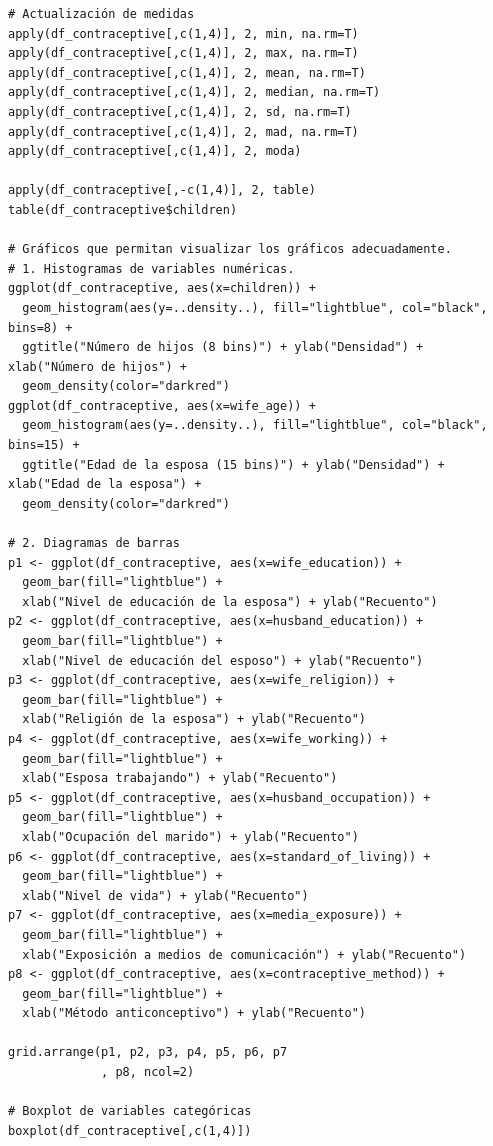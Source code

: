 \documentclass[a4paper,12pt, oneside]{book}
\begin{document}
\begin{verbatim}
# Actualización de medidas
apply(df_contraceptive[,c(1,4)], 2, min, na.rm=T)
apply(df_contraceptive[,c(1,4)], 2, max, na.rm=T)
apply(df_contraceptive[,c(1,4)], 2, mean, na.rm=T)
apply(df_contraceptive[,c(1,4)], 2, median, na.rm=T)
apply(df_contraceptive[,c(1,4)], 2, sd, na.rm=T)
apply(df_contraceptive[,c(1,4)], 2, mad, na.rm=T)
apply(df_contraceptive[,c(1,4)], 2, moda)

apply(df_contraceptive[,-c(1,4)], 2, table)
table(df_contraceptive$children)

# Gráficos que permitan visualizar los gráficos adecuadamente.
# 1. Histogramas de variables numéricas.
ggplot(df_contraceptive, aes(x=children)) + 
  geom_histogram(aes(y=..density..), fill="lightblue", col="black", bins=8) +
  ggtitle("Número de hijos (8 bins)") + ylab("Densidad") + xlab("Número de hijos") + 
  geom_density(color="darkred")
ggplot(df_contraceptive, aes(x=wife_age)) + 
  geom_histogram(aes(y=..density..), fill="lightblue", col="black", bins=15) +
  ggtitle("Edad de la esposa (15 bins)") + ylab("Densidad") + xlab("Edad de la esposa") + 
  geom_density(color="darkred")

# 2. Diagramas de barras
p1 <- ggplot(df_contraceptive, aes(x=wife_education)) + 
  geom_bar(fill="lightblue") + 
  xlab("Nivel de educación de la esposa") + ylab("Recuento")
p2 <- ggplot(df_contraceptive, aes(x=husband_education)) + 
  geom_bar(fill="lightblue") + 
  xlab("Nivel de educación del esposo") + ylab("Recuento")
p3 <- ggplot(df_contraceptive, aes(x=wife_religion)) + 
  geom_bar(fill="lightblue") + 
  xlab("Religión de la esposa") + ylab("Recuento")
p4 <- ggplot(df_contraceptive, aes(x=wife_working)) + 
  geom_bar(fill="lightblue") + 
  xlab("Esposa trabajando") + ylab("Recuento")
p5 <- ggplot(df_contraceptive, aes(x=husband_occupation)) + 
  geom_bar(fill="lightblue") + 
  xlab("Ocupación del marido") + ylab("Recuento")
p6 <- ggplot(df_contraceptive, aes(x=standard_of_living)) + 
  geom_bar(fill="lightblue") + 
  xlab("Nivel de vida") + ylab("Recuento")
p7 <- ggplot(df_contraceptive, aes(x=media_exposure)) + 
  geom_bar(fill="lightblue") + 
  xlab("Exposición a medios de comunicación") + ylab("Recuento")
p8 <- ggplot(df_contraceptive, aes(x=contraceptive_method)) + 
  geom_bar(fill="lightblue") + 
  xlab("Método anticonceptivo") + ylab("Recuento")

grid.arrange(p1, p2, p3, p4, p5, p6, p7
             , p8, ncol=2)

# Boxplot de variables categóricas
boxplot(df_contraceptive[,c(1,4)])


\end{verbatim}
\end{document}
